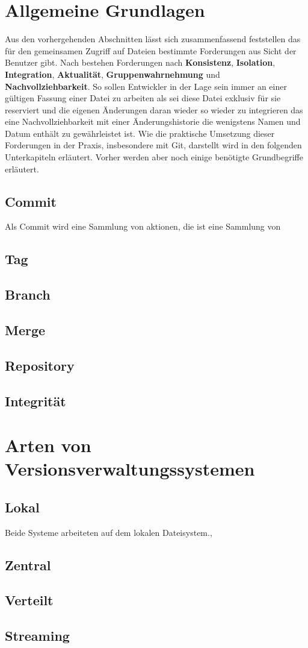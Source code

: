 \section{Allgemeine Grundlagen}\label{sec:Grundlagen}
Aus den vorhergehenden Abschnitten lässt sich zusammenfassend feststellen das
für den gemeinsamen Zugriff auf Dateien bestimmte Forderungen aus Sicht der
Benutzer gibt. Nach \cite[S.~37]{hagen:1678} bestehen Forderungen nach
\textbf{Konsistenz}, \textbf{Isolation}, \textbf{Integration},
\textbf{Aktualität}, \textbf{Gruppenwahrnehmung} und
\textbf{Nachvollziehbarkeit}. So sollen Entwickler in der Lage sein immer an
einer gültigen Fassung einer Datei zu arbeiten als sei diese Datei exklusiv für
sie reserviert und die eigenen Änderungen daran wieder so wieder zu integrieren
das eine Nachvollziehbarkeit mit einer Änderungshistorie die wenigstens Namen
und Datum enthält zu gewährleistet ist.  Wie die praktische Umsetzung dieser
Forderungen in der Praxis, insbesondere mit Git, darstellt wird in den
folgenden Unterkapiteln erläutert. Vorher werden aber noch einige benötigte
Grundbegriffe erläutert. 

\subsection{Commit}
Als Commit wird eine Sammlung von aktionen, die ist eine Sammlung von
\subsection{Tag}\label{sec:Tags}
\subsection{Branch}\label{sec:Branches}
\subsection{Merge}
\subsection{Repository}
\subsection{Integrität}

\section{Arten von Versionsverwaltungssystemen}
\subsection{Lokal}
Beide Systeme arbeiteten auf dem lokalen
Dateisystem.,
\subsection{Zentral}
\subsection{Verteilt}
\subsection{Streaming}

\label{sec:why}

